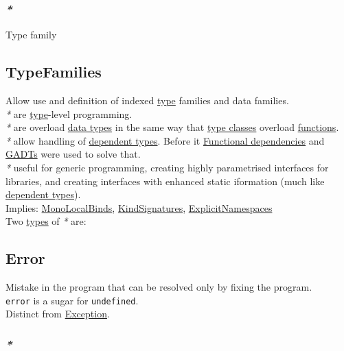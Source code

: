\documentclass[11pt]{article}
\begin{document}
\subsubsection{\emph{*}}
\label{sec:orga4fe43d}

\label{org5c4264c}Type family\\

\subsection{\label{org3f97bd6}TypeFamilies}
\label{sec:org5e409c5}
Allow use and definition of indexed \hyperref[orgc4aea2f]{type} families and data families.\\

\emph{*} are \hyperref[orgc4aea2f]{type}-level programming.\\
\emph{*} are overload \hyperref[org5c444ae]{data types} in the same way that \hyperref[orgead20df]{type classes} overload \hyperref[orgaa8fb87]{functions}.\\
\emph{*} allow handling of \hyperref[orga9e0480]{dependent types}. Before it \hyperref[orgf8fef8c]{Functional dependencies} and \hyperref[org7f1cfa8]{GADTs} were used to solve that.\\
\emph{*} useful for generic programming, creating highly parametrised interfaces for libraries, and creating interfaces with enhanced static iformation (much like \hyperref[orga9e0480]{dependent types}).\\

Implies: \hyperref[org6db8791]{MonoLocalBinds}, \hyperref[org06955ca]{KindSignatures}, \hyperref[orgc940591]{ExplicitNamespaces}\\

Two \hyperref[org4209edd]{types} of \emph{*} are:\\

\subsection{\label{org2b27c5e}Error}
\label{sec:org4b47e49}
Mistake in the program that can be resolved only by fixing the program.\\

\texttt{error} is a sugar for \texttt{undefined}.\\

Distinct from \hyperref[org39ea709]{Exception}.\\

\subsubsection{\emph{*}}
\label{sec:org334af15}
\end{document}
